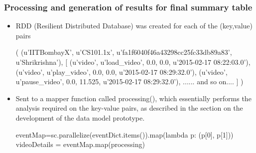 \documentclass[12pt,xcolor=dvipsnames]{beamer}
\begin{document}

\begin{frame}[t]
\frametitle{Processing and generation of results for final summary table}
\vfill
\begin{itemize}

\item RDD (Resilient Distributed Database) was created for each of the (key,value) pairs

\begin{scriptsize}
(
    (u’IITBombayX’, u’CS101.1x’, u’fa1f6040f46a43298cc25fc33db89a83’, u’Shrikrishna’),
    [
        (u’video’, u’load\_video’, 0.0, 0.0, u’2015-02-17 08:22:03.0’),
        (u’video’, u’play\_video’, 0.0, 0.0, u’2015-02-17 08:29:32.0’),
        (u’video’, u’pause\_video’, 0.0, 11.525, u’2015-02-17 08:29:32.0’),
        ...... and so on....
    ]
)

\vfill
\end{scriptsize}

\item Sent to a mapper function called processing(), which essentially performs the analysis required on the key-value
pairs, as described in the section on the development of the data model prototype.

\begin{scriptsize}
eventMap=sc.parallelize(eventDict.items()).map(lambda p: (p[0], p[1]))\\
videoDetails = eventMap.map(processing)
\end{scriptsize}

\end{itemize}

\end{frame}

\end{document}
